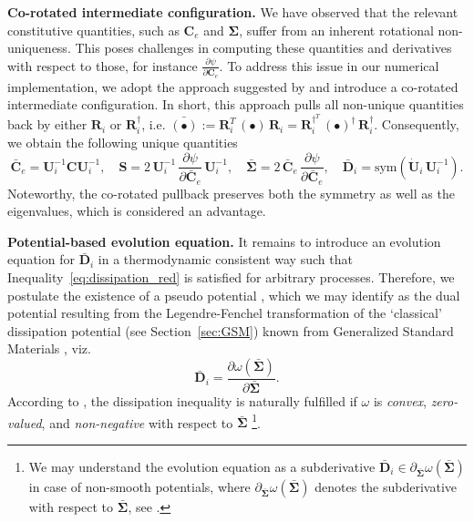\textbf{Co-rotated intermediate configuration.} We have observed that the relevant constitutive quantities, such as $\bm{C}_e$ and $\bm{\Sigma}$, suffer from an inherent rotational non-uniqueness.
This poses challenges in computing these quantities and derivatives with respect to those, for instance $\frac{\partial\psi}{\partial\bm{C}_e}$.
To address this issue in our numerical implementation, we adopt the approach suggested by \cite{holthusen2023} and introduce a co-rotated intermediate configuration.
In short, this approach pulls all non-unique quantities back by either $\bm{R}_i$ or $\bm{R}_i^\dagger$, i.e. $\bar{(\bullet)}:=\bm{R}_i^T\,(\bullet)\,\bm{R}_i = \bm{R}_i^{\dagger^T}\,(\bullet)^\dagger\,\bm{R}_i^\dagger$.
Consequently, we obtain the following unique quantities
%
\begin{equation}
    \label{tb_eq:10}
    \bar{\bm{C}}_e = \bm{U}_i^{-1}\bm{C}\bm{U}_i^{-1}, \quad \bm{S} = 2\,\bm{U}_i^{-1}\,\frac{\partial\psi}{\partial\bar{\bm{C}}_e}\,\bm{U}_i^{-1}, \quad \bar{\bm{\Sigma}} = 2\,\bar{\bm{C}}_e\,\frac{\partial\psi}{\partial\bar{\bm{C}}_e}, \quad \bar{\bm{D}}_i = \mathrm{sym}\left(\dot{\bm{U}}_i\,\bm{U}_i^{-1} \right).
\end{equation}
%
Noteworthy, the co-rotated pullback preserves both the symmetry as well as the eigenvalues, which is considered an advantage.\newline

\textbf{Potential-based evolution equation.} It remains to introduce an evolution equation for $\bar{\bm{D}}_i$ in a thermodynamic consistent way such that Inequality~\eqref{eq:dissipation_red} is satisfied for arbitrary processes.
Therefore, we postulate the existence of a pseudo potential \cite{kerstin1969}, which we may identify as the dual potential resulting from the Legendre-Fenchel transformation of the `classical' dissipation potential (see Section~\ref{sec:GSM}) known from Generalized Standard Materials \cite{halphen1975}, viz.\
%
\begin{equation}
    \bar{\bm{D}}_i = \frac{\partial \omega\left(\bar{\bm{\Sigma}}\right)}{\partial\bar{\bm{\Sigma}}}.
\label{eq:EvolutionEquation}
\end{equation}
%
According to \citet{germain1983}, the dissipation inequality is naturally fulfilled if $\omega$ is \textit{convex}, \textit{zero-valued}, and \textit{non-negative} with respect to $\bar{\bm{\Sigma}}$ \cite{holthusen2025growth}\footnote{We may understand the evolution equation as a subderivative $\bar{\bm{D}}_i \in \partial_{\bar{\bm{\Sigma}}}\omega\left(\bar{\bm{\Sigma}}\right)$ in case of non-smooth potentials, where $\partial_{\bar{\bm{\Sigma}}}\omega\left(\bar{\bm{\Sigma}}\right)$ denotes the subderivative with respect to $\bar{\bm{\Sigma}}$, see \cite{germain1998}.}.\newline

